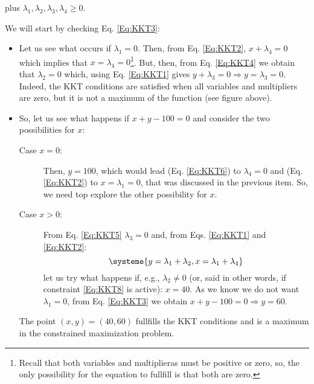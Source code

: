 \begin{itemize}
  plus $\lambda_1,\lambda_2,\lambda_3,\lambda_4\geq 0$.

  We will start by checking Eq. \ref{Eq:KKT3}:
  \begin{itemize}
    \item  Let us see what occurs if $\lambda_1=0$. Then, from Eq. \ref{Eq:KKT2}, $x+\lambda_4=0$ which implies that $x=\lambda_4=0$\footnote{Recall that both variables and multiplieras must be positive or zero, so, the only possibility for the equation to fullfill is that both are zero.}. But, then, from Eq. \ref{Eq:KKT4} we obtain that $\lambda_2=0$ which, using Eq. \ref{Eq:KKT1} gives $y+\lambda_3=0\Rightarrow y=\lambda_3=0$. Indeed, the KKT conditions are satisfied when all variables and multipliers are zero, but it is not a maximum of the function (see figure above).
    \item So, let us see what happens if $x+y-100=0$ and consider the two possibilities for $x$:
    \begin{description}
      \item[Case $x=0$:] Then, $y=100$, which would lead (Eq. \ref{Eq:KKT6}) to $\lambda_4=0$ and (Eq. \ref{Eq:KKT2}) to $x=\lambda_1=0$, that was discussed in the previous item. So, we need top explore the other possibility for $x$.
      \item[Case $x>0$:] From Eq. \ref{Eq:KKT5} $\lambda_3=0$ and, from Eqs. \ref{Eq:KKT1} and \ref{Eq:KKT2}:
      \[\systeme{y=\lambda_1+\lambda_2,x=\lambda_1+\lambda_4}
      \] 
      let us try what happens if, e.g., $\lambda_2\neq 0$ (or, said in other words, if constraint \ref{Eq:KKT8} is active): $x=40$. As we know we do not want $\lambda_1=0$, from Eq. \ref{Eq:KKT3} we obtain $x+y-100=0\Rightarrow y=60$.
    \end{description}

    The point $(x,y)=(40,60)$ fullfills the KKT conditions and is a maximum in the constrained maximization problem.

 \end{itemize}
\end{itemize}